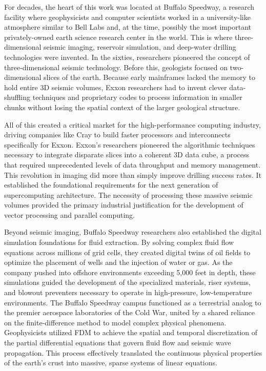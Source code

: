 For decades, the heart of this work was located at Buffalo Speedway, a research facility where geophysicists and computer scientists worked in a university-like atmosphere similar to Bell Labs and, at the time, possibly the most important privately-owned earth science research center in the world. This is where three-dimensional seismic imaging, reservoir simulation, and deep-water drilling technologies were invented. In the sixties, researchers pioneered the concept of three-dimensional seismic technology. Before this, geologists focused on two-dimensional slices of the earth. Because early mainframes lacked the memory to hold entire 3D seismic volumes, Exxon researchers had to invent clever data-shuffling techniques and proprietary codes to process information in smaller chunks without losing the spatial context of the larger geological structure. 

All of this created a critical market for the high-performance computing industry, driving companies like Cray to build faster processors and interconnects specifically for Exxon. Exxon’s researchers pioneered the algorithmic techniques necessary to integrate disparate slices into a coherent 3D data cube, a process that required unprecedented levels of data throughput and memory management. This revolution in imaging did more than simply improve drilling success rates. It established the foundational requirements for the next generation of supercomputing architecture. The necessity of processing these massive seismic volumes provided the primary industrial justification for the development of vector processing and parallel computing.

Beyond seismic imaging, Buffalo Speedway researchers also established the digital simulation foundations for fluid extraction. By solving complex fluid flow equations across millions of grid cells, they created digital twins of oil fields to optimize the placement of wells and the injection of water or gas. As the company pushed into offshore environments exceeding 5,000 feet in depth, these simulations guided the development of the specialized materials, riser systems, and blowout preventers necessary to operate in high-pressure, low-temperature environments. The Buffalo Speedway campus functioned as a terrestrial analog to the premier aerospace laboratories of the Cold War, united by a shared reliance on the finite-difference method to model complex physical phenomena. Geophysicists utilized FDM to achieve the spatial and temporal discretization of the partial differential equations that govern fluid flow and seismic wave propagation. This process effectively translated the continuous physical properties of the earth’s crust into massive, sparse systems of linear equations. 

